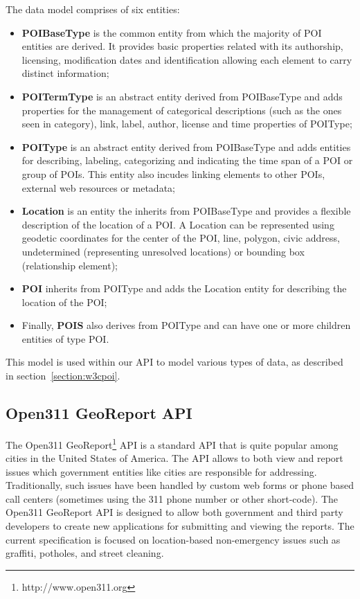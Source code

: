 \documentclass[times]{ettauth}
\begin{document}
The data model comprises of six entities:
\begin{itemize}
\item \textbf{POIBaseType} is the common entity from which the majority of POI entities are derived. It provides basic properties related with its authorship, licensing, modification dates and identification allowing each element to carry distinct information;
\item \textbf{POITermType} is an abstract entity derived from POIBaseType and adds properties for the management of categorical descriptions (such as the ones seen in category), link, label, author, license and time properties of POIType;
\item \textbf{POIType} is an abstract entity derived from POIBaseType and adds entities for describing, labeling, categorizing and indicating the time span of a POI or group of POIs. This entity also incudes linking elements to other POIs, external web resources or metadata;
\item \textbf{Location} is an entity the inherits from POIBaseType and provides a flexible description of the location of a POI. A Location can be represented using geodetic coordinates for the center of the POI, line, polygon, civic address,  undetermined (representing unresolved locations) or bounding box (relationship element);
\item \textbf{POI} inherits from POIType and adds the Location entity for describing the location of the POI;
\item Finally, \textbf{POIS} also derives from POIType and can have one or more children entities of type POI.
\end{itemize}

This model is used within our API to model various types of data, as described in section~\ref{section:w3cpoi}.

\subsection{Open311 GeoReport API}

The Open311 GeoReport\footnote{http://www.open311.org} API is a standard API that is quite popular among cities in the United States of America.
The API allows to both view and report issues which government entities like cities are responsible for addressing.
Traditionally, such issues have been handled by custom web forms or phone based call centers (sometimes using the 311 phone number or other short-code).
The Open311 GeoReport API is designed to allow both government and third party developers to create new applications for submitting and viewing the reports.
The current specification is focused on location-based non-emergency issues such as graffiti, potholes, and street cleaning.
\end{document}
